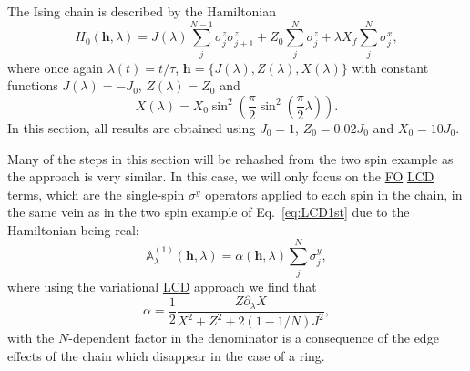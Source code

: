 \documentclass[a4paper,oneside,11pt]{book}
\newcommand{\hbb}{\boldsymbol{h}}
\newcommand{\sx}{\sigma^x}
\newcommand{\sy}{\sigma^y}
\newcommand{\sz}{\sigma^z}
\newcommand{\dlambda}{\partial_{\lambda}}
\newcommand{\approxAGP}{\mathbb{A}_{\lambda}}
\newcommand{\acrref}[1]{\hyperref[acr:#1]{#1}}
\begin{document}
The Ising chain is described by the Hamiltonian
\begin{equation}\label{eq:ising_chain_hamiltonian}
    H_0(\hbb,\lambda) = J(\lambda) \sum_{j}^{N-1} \sz_j \sz_{j+1} + Z_0\sum_j^N \sz_j + \lambda X_f \sum_j^N \sx_j,
\end{equation}
where once again $\lambda(t) = t/\tau$, $\hbb = \{ J(\lambda), Z(\lambda), X(\lambda) \}$ with constant functions $J(\lambda) = -J_0$, $Z(\lambda) = Z_0$ and
\begin{equation}
    X(\lambda) = X_0 \sin^2\left(\frac{\pi}{2} \sin^2 \left( \frac{\pi}{2} \lambda \right) \right).
\end{equation}
In this section, all results are obtained using $J_0 = 1$, $Z_0 = 0.02J_0$ and $X_0 = 10J_0$.

Many of the steps in this section will be rehashed from the two spin example as the approach is very similar. In this case, we will only focus on the \acrref{FO} \acrref{LCD} terms, which are the single-spin $\sy$ operators applied to each spin in the chain, in the same vein as in the two spin example  of Eq.~\ref{eq:LCD1st} due to the Hamiltonian being real:
\begin{equation}\label{eq:ising_fo_agp}
    \approxAGP^{(1)}(\hbb, \lambda) = \alpha(\hbb, \lambda) \sum_{j}^N\sy_j,
\end{equation}
where using the variational \acrref{LCD} approach we find that 
\begin{equation}
    \alpha = \frac{1}{2} \frac{Z \dlambda X}{X^2 + Z^2 + 2(1 - 1/N)J^2},
\end{equation}
with the $N$-dependent factor in the denominator is a consequence of the edge effects of the chain which disappear in the case of a ring. 
\end{document}
